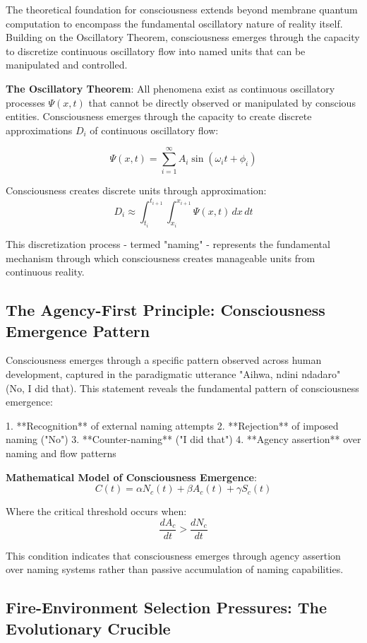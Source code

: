 \documentclass[12pt]{article}
\begin{document}
The theoretical foundation for consciousness extends beyond membrane quantum computation to encompass the fundamental oscillatory nature of reality itself. Building on the Oscillatory Theorem, consciousness emerges through the capacity to discretize continuous oscillatory flow into named units that can be manipulated and controlled.

\textbf{The Oscillatory Theorem}: All phenomena exist as continuous oscillatory processes $\Psi(x,t)$ that cannot be directly observed or manipulated by conscious entities. Consciousness emerges through the capacity to create discrete approximations $D_i$ of continuous oscillatory flow:

$$\Psi(x,t) = \sum_{i=1}^{\infty} A_i \sin(\omega_i t + \phi_i)$$

Consciousness creates discrete units through approximation:
$$D_i \approx \int_{t_i}^{t_{i+1}} \int_{x_i}^{x_{i+1}} \Psi(x,t) \, dx \, dt$$

This discretization process - termed "naming" - represents the fundamental mechanism through which consciousness creates manageable units from continuous reality.

\subsection{The Agency-First Principle: Consciousness Emergence Pattern}

Consciousness emerges through a specific pattern observed across human development, captured in the paradigmatic utterance "Aihwa, ndini ndadaro" (No, I did that). This statement reveals the fundamental pattern of consciousness emergence:

1. **Recognition** of external naming attempts
2. **Rejection** of imposed naming ("No")
3. **Counter-naming** ("I did that")
4. **Agency assertion** over naming and flow patterns

\textbf{Mathematical Model of Consciousness Emergence}:
$$C(t) = \alpha N_c(t) + \beta A_c(t) + \gamma S_c(t)$$

Where the critical threshold occurs when:
$$\frac{dA_c}{dt} > \frac{dN_c}{dt}$$

This condition indicates that consciousness emerges through agency assertion over naming systems rather than passive accumulation of naming capabilities.

\subsection{Fire-Environment Selection Pressures: The Evolutionary Crucible}
\end{document}
